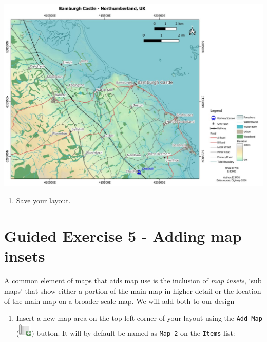\documentclass[
  letterpaper,
  DIV=11,
  numbers=noendperiod]{scrreprt}
\providecommand{\tightlist}{%
  \setlength{\itemsep}{0pt}\setlength{\parskip}{0pt}}\usepackage{longtable,booktabs,array}
\begin{document}
\includegraphics{images/lab_8/lab8_fig19_almost_done.jpg}

\begin{enumerate}
\def\labelenumi{(\arabic{enumi})}
\setcounter{enumi}{267}
\tightlist
\item
  Save your layout.
\end{enumerate}

\section{Guided Exercise 5 - Adding map
insets}\label{guided-exercise-5---adding-map-insets}

A common element of maps that aids map use is the inclusion of \emph{map
insets}, `sub maps' that show either a portion of the main map in higher
detail or the location of the main map on a broader scale map. We will
add both to our design

\begin{enumerate}
\def\labelenumi{(\arabic{enumi})}
\setcounter{enumi}{268}
\tightlist
\item
  Insert a new map area on the top left corner of your layout using the
  \texttt{Add\ Map}
  (\includegraphics{index_files/mediabag/mActionAddMap1.png}) button. It
  will by default be named as \texttt{Map\ 2} on the \texttt{Items}
  list:
\end{enumerate}
\end{document}
